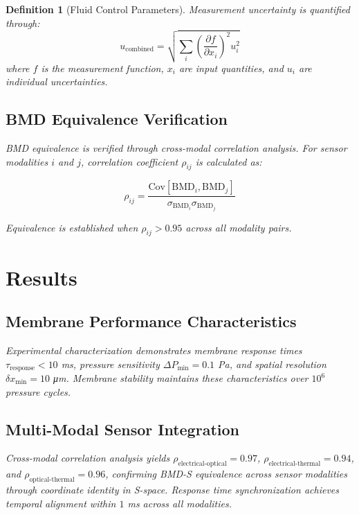 \documentclass[12pt,a4paper]{article}
\newtheorem{definition}{Definition}
\begin{document}
\begin{definition}[Fluid Control Parameters]
Measurement uncertainty is quantified through:
\begin{equation}
u_{\text{combined}} = \sqrt{\sum_{i} \left(\frac{\partial f}{\partial x_i}\right)^2 u_i^2}
\end{equation}
where $f$ is the measurement function, $x_i$ are input quantities, and $u_i$ are individual uncertainties.

\subsection{BMD Equivalence Verification}

BMD equivalence is verified through cross-modal correlation analysis. For sensor modalities $i$ and $j$, correlation coefficient $\rho_{ij}$ is calculated as:

\begin{equation}
\rho_{ij} = \frac{\text{Cov}[\text{BMD}_i, \text{BMD}_j]}{\sigma_{\text{BMD}_i} \sigma_{\text{BMD}_j}}
\end{equation}

Equivalence is established when $\rho_{ij} > 0.95$ across all modality pairs.

\section{Results}

\subsection{Membrane Performance Characteristics}

Experimental characterization demonstrates membrane response times $\tau_{\text{response}} < 10$ ms, pressure sensitivity $\Delta P_{\text{min}} = 0.1$ Pa, and spatial resolution $\delta x_{\text{min}} = 10$ μm. Membrane stability maintains these characteristics over $10^6$ pressure cycles.

\subsection{Multi-Modal Sensor Integration}

Cross-modal correlation analysis yields $\rho_{\text{electrical-optical}} = 0.97$, $\rho_{\text{electrical-thermal}} = 0.94$, and $\rho_{\text{optical-thermal}} = 0.96$, confirming BMD-S equivalence across sensor modalities through coordinate identity in S-space. Response time synchronization achieves temporal alignment within $1$ ms across all modalities.


\end{definition}
\end{document}
